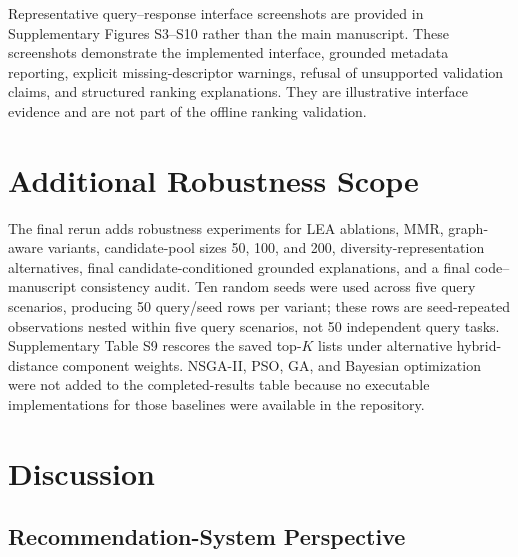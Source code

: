 \documentclass[12pt,a4paper]{article}
\begin{document}
Representative query--response interface screenshots are provided in Supplementary Figures S3--S10 rather than the main manuscript. These screenshots demonstrate the implemented interface, grounded metadata reporting, explicit missing-descriptor warnings, refusal of unsupported validation claims, and structured ranking explanations. They are illustrative interface evidence and are not part of the offline ranking validation.

\section{Additional Robustness Scope}
\label{sec:robustness}

The final rerun adds robustness experiments for LEA ablations, MMR, graph-aware variants, candidate-pool sizes 50, 100, and 200, diversity-representation alternatives, final candidate-conditioned grounded explanations, and a final code--manuscript consistency audit. Ten random seeds were used across five query scenarios, producing 50 query/seed rows per variant; these rows are seed-repeated observations nested within five query scenarios, not 50 independent query tasks. Supplementary Table S9 rescores the saved top-$K$ lists under alternative hybrid-distance component weights. NSGA-II, PSO, GA, and Bayesian optimization were not added to the completed-results table because no executable implementations for those baselines were available in the repository.

\section{Discussion}
\label{sec:discussion}

\subsection{Recommendation-System Perspective}
\end{document}
